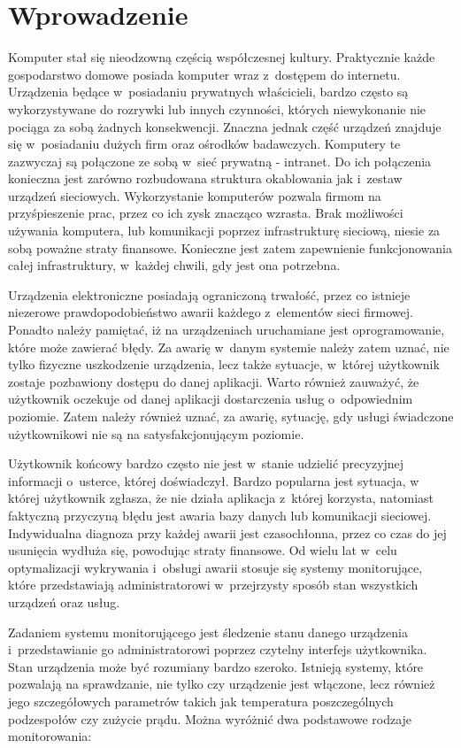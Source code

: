 \chapter{Wprowadzenie}

Komputer stał się nieodzowną częścią współczesnej kultury. Praktycznie
każde gospodarstwo domowe posiada komputer wraz z~dostępem do
internetu. Urządzenia będące w~posiadaniu prywatnych właścicieli,
bardzo często są wykorzystywane do rozrywki lub innych czynności,
których niewykonanie nie pociąga za sobą żadnych konsekwencji. Znaczna
jednak część urządzeń znajduje się w~posiadaniu dużych firm oraz
ośrodków badawczych. Komputery te zazwyczaj są połączone ze sobą
w~sieć prywatną - intranet. Do ich połączenia konieczna jest zarówno
rozbudowana struktura okablowania jak i~zestaw urządzeń
sieciowych. Wykorzystanie komputerów pozwala firmom na przyśpieszenie
prac, przez co ich zysk znacząco wzrasta. Brak możliwości używania
komputera, lub komunikacji poprzez infrastrukturę sieciową, niesie za
sobą poważne straty finansowe. Konieczne jest zatem zapewnienie
funkcjonowania całej infrastruktury, w~każdej chwili, gdy jest ona
potrzebna.

Urządzenia elektroniczne posiadają ograniczoną trwałość, przez co
istnieje niezerowe prawdopodobieństwo awarii każdego z~elementów sieci
firmowej. Ponadto należy pamiętać, iż na urządzeniach uruchamiane jest
oprogramowanie, które może zawierać błędy. Za awarię w~danym systemie
należy zatem uznać, nie tylko fizyczne uszkodzenie urządzenia, lecz
także sytuacje, w~której użytkownik zostaje pozbawiony dostępu do
danej aplikacji. Warto również zauważyć, że użytkownik oczekuje od
danej aplikacji dostarczenia usług o~odpowiednim poziomie. Zatem
należy również uznać, za awarię, sytuację, gdy usługi świadczone
użytkownikowi nie są na satysfakcjonującym poziomie.

Użytkownik końcowy bardzo często nie jest w~stanie udzielić
precyzyjnej informacji o~usterce, której doświadczył. Bardzo popularna
jest sytuacja, w której użytkownik zgłasza, że nie działa aplikacja
z~której korzysta, natomiast faktyczną przyczyną błędu jest awaria
bazy danych lub komunikacji sieciowej. Indywidualna diagnoza przy
każdej awarii jest czasochłonna, przez co czas do jej usunięcia
wydłuża się, powodując straty finansowe. Od wielu lat w~celu
optymalizacji wykrywania i~obsługi awarii stosuje się systemy
monitorujące, które przedstawiają administratorowi w~przejrzysty
sposób stan wszystkich urządzeń oraz usług.

Zadaniem systemu monitorującego jest śledzenie stanu danego urządzenia
i~przedstawianie go administratorowi poprzez czytelny interfejs
użytkownika. Stan urządzenia może być rozumiany bardzo
szeroko. Istnieją systemy, które pozwalają na sprawdzanie, nie tylko
czy urządzenie jest włączone, lecz również jego szczegółowych
parametrów takich jak temperatura poszczególnych podzespołów czy
zużycie prądu. Można wyróżnić dwa podstawowe rodzaje monitorowania:

